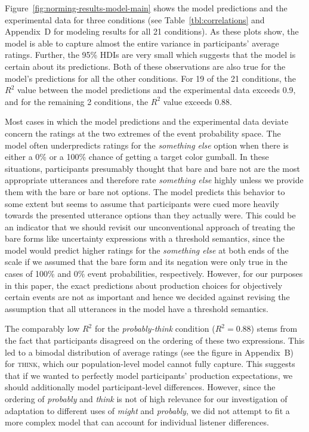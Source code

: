 \documentclass[man, floatsintext]{apa6}
\begin{document}
Figure~\ref{fig:norming-results-model-main} shows the model predictions and the experimental data for three conditions 
(see Table~\ref{tbl:correlations} and Appendix~D for modeling results for all 21 conditions). As these plots show, the model
is able to capture almost the entire variance in participants' average ratings. Further, the 95\% HDIs are very small which suggests
that the model is certain about its predictions. Both of these observations are also true for the model's predictions for all the other
conditions. For 19 of the 21 conditions, the $R^2$ value between the model predictions and the experimental data exceeds 0.9,
and for the remaining 2 conditions, the $R^2$ value exceeds 0.88. 

Most cases in which the model predictions and the experimental data deviate concern the ratings at the two extremes of the event probability space.
The model often underpredicts ratings for the \textit{something else} option when there is either a 0\% or a 100\% chance of 
getting a target color gumball. In these situations, participants presumably thought that {\sc bare} and {\sc bare not} are the most appropriate
utterances and therefore rate \textit{something else} highly unless we provide them with the {\sc bare} or {\sc bare not} options. The model predicts
this behavior to some extent but seems to assume that participants were cued more heavily towards the presented utterance options than they actually were.
This could be an indicator that we should revisit our unconventional approach of treating the bare forms like uncertainty expressions with a threshold semantics,
since the model would predict higher ratings for the \textit{something else} at both ends of the scale if we assumed that the bare form and its negation were only true
in the cases of 100\% and 0\% event probabilities, respectively. 
However, for our purposes in this paper, the exact predictions about production choices for objectively certain events are not as important and hence
we decided against revising the assumption that all utterances in the model have a threshold semantics.

The comparably low $R^2$ for the \textit{probably-think} condition ($R^2=0.88$) stems
from the fact that participants disagreed on the ordering of these two expressions. This  
led to a bimodal distribution of average ratings (see the figure in Appendix~B) for \textsc{think}, which our population-level 
model cannot fully capture. This suggests that if we wanted to perfectly model participants' production expectations, we should
additionally model participant-level differences. However, since the ordering of \textit{probably} and \textit{think} is not of high relevance
for our investigation of adaptation to different uses of \textit{might} and \textit{probably}, we did not attempt to fit a more complex model
that can account for individual listener differences. 
\end{document}
